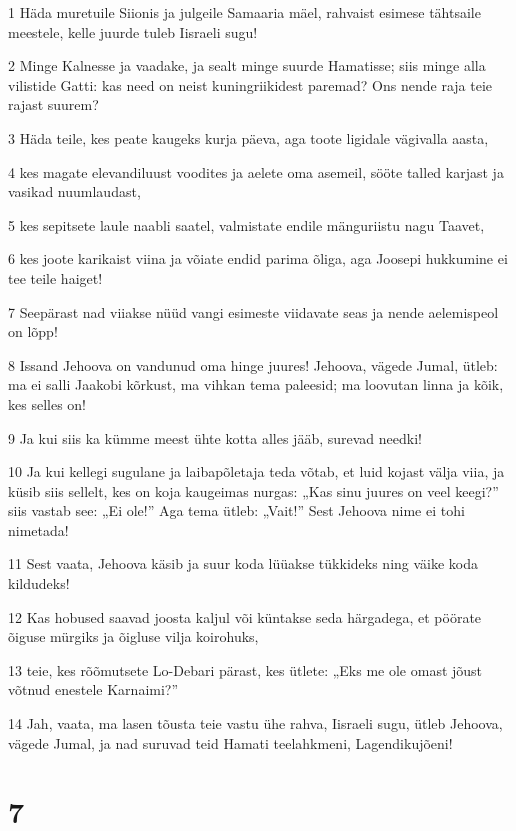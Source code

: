 \par 1 Häda muretuile Siionis ja julgeile Samaaria mäel, rahvaist esimese tähtsaile meestele, kelle juurde tuleb Iisraeli sugu!
\par 2 Minge Kalnesse ja vaadake, ja sealt minge suurde Hamatisse; siis minge alla vilistide Gatti: kas need on neist kuningriikidest paremad? Ons nende raja teie rajast suurem?
\par 3 Häda teile, kes peate kaugeks kurja päeva, aga toote ligidale vägivalla aasta,
\par 4 kes magate elevandiluust voodites ja aelete oma asemeil, sööte talled karjast ja vasikad nuumlaudast,
\par 5 kes sepitsete laule naabli saatel, valmistate endile mänguriistu nagu Taavet,
\par 6 kes joote karikaist viina ja võiate endid parima õliga, aga Joosepi hukkumine ei tee teile haiget!
\par 7 Seepärast nad viiakse nüüd vangi esimeste viidavate seas ja nende aelemispeol on lõpp!
\par 8 Issand Jehoova on vandunud oma hinge juures! Jehoova, vägede Jumal, ütleb: ma ei salli Jaakobi kõrkust, ma vihkan tema paleesid; ma loovutan linna ja kõik, kes selles on!
\par 9 Ja kui siis ka kümme meest ühte kotta alles jääb, surevad needki!
\par 10 Ja kui kellegi sugulane ja laibapõletaja teda võtab, et luid kojast välja viia, ja küsib siis sellelt, kes on koja kaugeimas nurgas: „Kas sinu juures on veel keegi?” siis vastab see: „Ei ole!” Aga tema ütleb: „Vait!” Sest Jehoova nime ei tohi nimetada!
\par 11 Sest vaata, Jehoova käsib ja suur koda lüüakse tükkideks ning väike koda kildudeks!
\par 12 Kas hobused saavad joosta kaljul või küntakse seda härgadega, et pöörate õiguse mürgiks ja õigluse vilja koirohuks,
\par 13 teie, kes rõõmutsete Lo-Debari pärast, kes ütlete: „Eks me ole omast jõust võtnud enestele Karnaimi?”
\par 14 Jah, vaata, ma lasen tõusta teie vastu ühe rahva, Iisraeli sugu, ütleb Jehoova, vägede Jumal, ja nad suruvad teid Hamati teelahkmeni, Lagendikujõeni!

\chapter{7}

